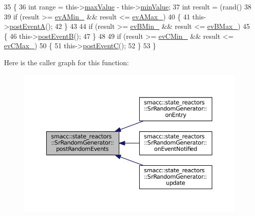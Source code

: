 \begin{DoxyCode}
35 \{
36     \textcolor{keywordtype}{int} range = this->\hyperlink{classsmacc_1_1state__reactors_1_1SrRandomGenerator_a693a1e627efe396dbb4f2849ce14d85d}{maxValue} - this->\hyperlink{classsmacc_1_1state__reactors_1_1SrRandomGenerator_ab2a695fd1f34b17aff3ab36fb38e3765}{minValue};
37     \textcolor{keywordtype}{int} result = (rand() %
38 
39     \textcolor{keywordflow}{if} (result >= \hyperlink{classsmacc_1_1state__reactors_1_1SrRandomGenerator_aaa18a0eec1d0777ea1607b5ac7491495}{evAMin\_} && result <= \hyperlink{classsmacc_1_1state__reactors_1_1SrRandomGenerator_ad5148909923e6761c7de33749f324609}{evAMax\_})
40     \{
41         this->\hyperlink{classsmacc_1_1state__reactors_1_1SrRandomGenerator_ac157de4b848ebc5da1acb593f7b25108}{postEventA}();
42     \}
43 
44     \textcolor{keywordflow}{if} (result >= \hyperlink{classsmacc_1_1state__reactors_1_1SrRandomGenerator_ae1022906bed4d126b7520f81c3e52976}{evBMin\_} && result <= \hyperlink{classsmacc_1_1state__reactors_1_1SrRandomGenerator_ad4b1ecc14ae3d153e3b1fe5006a8a192}{evBMax\_})
45     \{
46         this->\hyperlink{classsmacc_1_1state__reactors_1_1SrRandomGenerator_a0b38db23bf80e0709c2ae51c6a64ac1c}{postEventB}();
47     \}
48 
49     \textcolor{keywordflow}{if} (result >= \hyperlink{classsmacc_1_1state__reactors_1_1SrRandomGenerator_a048ec99a9978b1d51b8ecb96be4800c8}{evCMin\_} && result <= \hyperlink{classsmacc_1_1state__reactors_1_1SrRandomGenerator_af74df138d11468fd2b1d998698fd9503}{evCMax\_})
50     \{
51         this->\hyperlink{classsmacc_1_1state__reactors_1_1SrRandomGenerator_a1aeb07de7b52a9f5811e5f60444731a0}{postEventC}();
52     \}
53 \}
\end{DoxyCode}


Here is the caller graph for this function\+:
\nopagebreak
\begin{figure}[H]
\begin{center}
\leavevmode
\includegraphics[width=350pt]{classsmacc_1_1state__reactors_1_1SrRandomGenerator_a50638c93ca9444fbeecea6e72bc6ac35_icgraph}
\end{center}
\end{figure}


